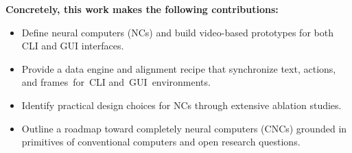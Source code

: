 \textbf{Concretely, this work makes the following contributions:}
{
\renewcommand\labelitemi{\large$\bullet$}
\begin{itemize}
\setlength{\itemsep}{2pt plus 1pt minus 1pt}
\setlength{\parskip}{0pt}
\item Define neural computers (NCs) and build video-based prototypes for both CLI and GUI interfaces.
\item Provide a data engine and alignment recipe that synchronize text, actions, and frames~for~CLI and~GUI~environments.
\item Identify practical design choices for NCs through extensive ablation studies.
\item Outline a roadmap toward completely neural computers (CNCs) grounded in primitives of conventional computers and open research questions.

\end{itemize}
}
